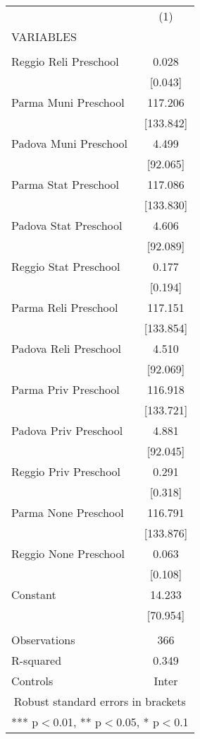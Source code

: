 \begin{tabular}{lc} \hline
 & (1) \\
VARIABLES &  \\ \hline
 &  \\
Reggio Reli Preschool & 0.028 \\
 & [0.043] \\
Parma Muni Preschool & 117.206 \\
 & [133.842] \\
Padova Muni Preschool & 4.499 \\
 & [92.065] \\
Parma Stat Preschool & 117.086 \\
 & [133.830] \\
Padova Stat Preschool & 4.606 \\
 & [92.089] \\
Reggio Stat Preschool & 0.177 \\
 & [0.194] \\
Parma Reli Preschool & 117.151 \\
 & [133.854] \\
Padova Reli Preschool & 4.510 \\
 & [92.069] \\
Parma Priv Preschool & 116.918 \\
 & [133.721] \\
Padova Priv Preschool & 4.881 \\
 & [92.045] \\
Reggio Priv Preschool & 0.291 \\
 & [0.318] \\
Parma None Preschool & 116.791 \\
 & [133.876] \\
Reggio None Preschool & 0.063 \\
 & [0.108] \\
Constant & 14.233 \\
 & [70.954] \\
 &  \\
Observations & 366 \\
R-squared & 0.349 \\
 Controls & Inter \\ \hline
\multicolumn{2}{c}{ Robust standard errors in brackets} \\
\multicolumn{2}{c}{ *** p$<$0.01, ** p$<$0.05, * p$<$0.1} \\
\end{tabular}
